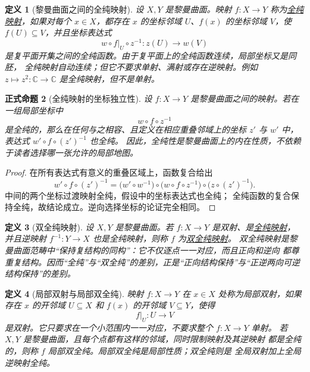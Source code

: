 \documentclass[UTF8,fontset=none,a4paper,11pt]{ctexart}
\theoremstyle{foundation-definition}
\newtheorem{definition}{定义}[section]
\theoremstyle{foundation-theorem}
\theoremstyle{foundation-proposition}
\newtheorem{proposition}[definition]{正式命题}
\theoremstyle{foundation-example}
\theoremstyle{foundation-remark}
\theoremstyle{foundation-theorem}
\newcommand{\term}[2]{\hyperref[#1]{#2}}
\begin{document}
\begin{definition}[黎曼曲面之间的全纯映射]\label{def:holomorphic-map}
设 \(X,Y\) 是黎曼曲面。映射 \(f:X\to Y\) 称为\term{def:holomorphic-map}{全纯映射}，如果对每个
\(x\in X\)，都存在 \(x\) 的坐标邻域 \(U\)、\(f(x)\) 的坐标邻域 \(V\)，使
\(f(U)\subseteq V\)，并且坐标表达式
\[
  w\circ f|_U\circ z^{-1}:z(U)\longrightarrow w(V)
\]
是复平面开集之间的全纯函数。由于复平面上的全纯函数连续，局部坐标又是同胚，
全纯映射自动连续；但它不要求单射、满射或存在逆映射。例如
 \(z\mapsto z^2:\mathbb C\to\mathbb C\) 是全纯映射，但不是单射。
\end{definition}

\begin{proposition}[全纯映射的坐标独立性]\label{prop:holomorphic-coordinate-independence}
设 \(f:X\to Y\) 是黎曼曲面之间的映射。若在一组局部坐标中
\[
w\circ f\circ z^{-1}
\]
是全纯的，那么在任何与之相容、且定义在相应重叠邻域上的坐标
\(z'\) 与 \(w'\) 中，表达式 \(w'\circ f\circ(z')^{-1}\) 也全纯。
因此，全纯性是黎曼曲面上的内在性质，不依赖于读者选择哪一张允许的局部地图。
\end{proposition}

\begin{proof}
在所有表达式有意义的重叠区域上，函数复合给出
\[
w'\circ f\circ(z')^{-1}
=\bigl(w'\circ w^{-1}\bigr)
\circ\bigl(w\circ f\circ z^{-1}\bigr)
\circ\bigl(z\circ(z')^{-1}\bigr).
\]
中间的两个坐标过渡映射全纯，假设中的坐标表达式也全纯；
全纯函数的复合保持全纯，故结论成立。逆向选择坐标的论证完全相同。
\end{proof}

\begin{definition}[双全纯映射]\label{def:biholomorphic}
设 \(X,Y\) 是黎曼曲面。若 \(f:X\to Y\) 是双射、是\term{def:holomorphic-map}{全纯映射}，
并且逆映射 \(f^{-1}:Y\to X\) 也是全纯映射，则称 \(f\) 为\term{def:biholomorphic}{双全纯映射}。
双全纯映射是黎曼曲面范畴中“保持复结构的同构”：它不仅逐点一一对应，而且正向和逆向
都尊重复结构。因而“全纯”与“双全纯”的差别，正是“正向结构保持”与“正逆两向可逆结构保持”的差别。
\end{definition}

\begin{definition}[局部双射与局部双全纯]\label{def:local-bijection}
映射 \(f:X\to Y\) 在 \(x\in X\) 处称为局部双射，如果存在 \(x\) 的开邻域
\(U\subseteq X\) 和 \(f(x)\) 的开邻域 \(V\subseteq Y\)，使得
\[
f|_U:U\longrightarrow V
\]
是双射。它只要求在一个小范围内一一对应，不要求整个 \(f:X\to Y\) 单射。
若 \(X,Y\) 是黎曼曲面，且每个点都有这样的邻域，同时限制映射及其逆映射
都是全纯的，则称 \(f\) 局部双全纯。局部双全纯是局部性质；双全纯则是
全局双射加上全局逆映射全纯。
\end{definition}
\end{document}
